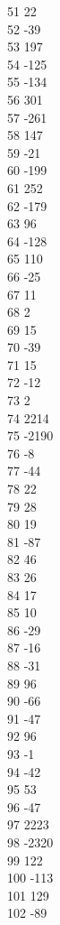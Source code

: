 { 51	22 \\
 52	-39 \\
 53	197 \\
 54	-125 \\
 55	-134 \\
 56	301 \\
 57	-261 \\
 58	147 \\
 59	-21 \\
 60	-199 \\
 61	252 \\
 62	-179 \\
 63	96 \\
 64	-128 \\
 65	110 \\
 66	-25 \\
 67	11 \\
 68	2 \\
 69	15 \\
 70	-39 \\
 71	15 \\
 72	-12 \\
 73	2 \\
 74	2214 \\
 75	-2190 \\
 76	-8 \\
 77	-44 \\
 78	22 \\
 79	28 \\
 80	19 \\
 81	-87 \\
 82	46 \\
 83	26 \\
 84	17 \\
 85	10 \\
 86	-29 \\
 87	-16 \\
 88	-31 \\
 89	96 \\
 90	-66 \\
 91	-47 \\
 92	96 \\
 93	-1 \\
 94	-42 \\
 95	53 \\
 96	-47 \\
 97	2223 \\
 98	-2320 \\
 99	122 \\
 100	-113 \\
 101	129 \\
 102	-89 \\
}

